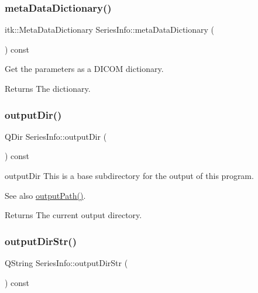 \subsubsection{\texorpdfstring{meta\+Data\+Dictionary()}{metaDataDictionary()}}
{\footnotesize\ttfamily itk\+::\+Meta\+Data\+Dictionary Series\+Info\+::meta\+Data\+Dictionary (\begin{DoxyParamCaption}{ }\end{DoxyParamCaption}) const}



Get the parameters as a D\+I\+C\+OM dictionary. 

\begin{DoxyReturn}{Returns}
The dictionary. 
\end{DoxyReturn}
\mbox{\label{class_series_info_af94b9048bc3b60b5d151f227299b394b}} 
\subsubsection{\texorpdfstring{output\+Dir()}{outputDir()}}
{\footnotesize\ttfamily Q\+Dir Series\+Info\+::output\+Dir (\begin{DoxyParamCaption}{ }\end{DoxyParamCaption}) const\hspace{0.3cm}{\ttfamily [inline]}}



output\+Dir This is a base subdirectory for the output of this program. 

\begin{DoxySeeAlso}{See also}
\hyperlink{class_series_info_a7088530574522d3d1123806c766402f2}{output\+Path()}. 
\end{DoxySeeAlso}
\begin{DoxyReturn}{Returns}
The current output directory. 
\end{DoxyReturn}
\mbox{\label{class_series_info_abc897c5c859293338e45d193ac62c674}} 
\subsubsection{\texorpdfstring{output\+Dir\+Str()}{outputDirStr()}}
{\footnotesize\ttfamily Q\+String Series\+Info\+::output\+Dir\+Str (\begin{DoxyParamCaption}{ }\end{DoxyParamCaption}) const\hspace{0.3cm}{\ttfamily [inline]}}



